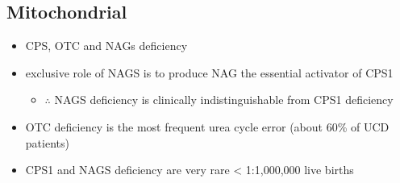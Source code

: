\documentclass{scrartcl}
\begin{document}
\subsection{Mitochondrial}
\label{sec:org2c834dd}
\begin{itemize}
\item CPS, OTC and NAGs deficiency
\item exclusive role of NAGS is to produce NAG the essential activator of CPS1
\begin{itemize}
\item \(\therefore\) NAGS deficiency is clinically indistinguishable from
CPS1 deficiency
\end{itemize}
\item OTC deficiency is the most frequent urea cycle error (about 60\% of UCD patients)
\item CPS1 and NAGS deficiency are very rare \textless{} 1:1,000,000 live births
\end{itemize}
\end{document}
